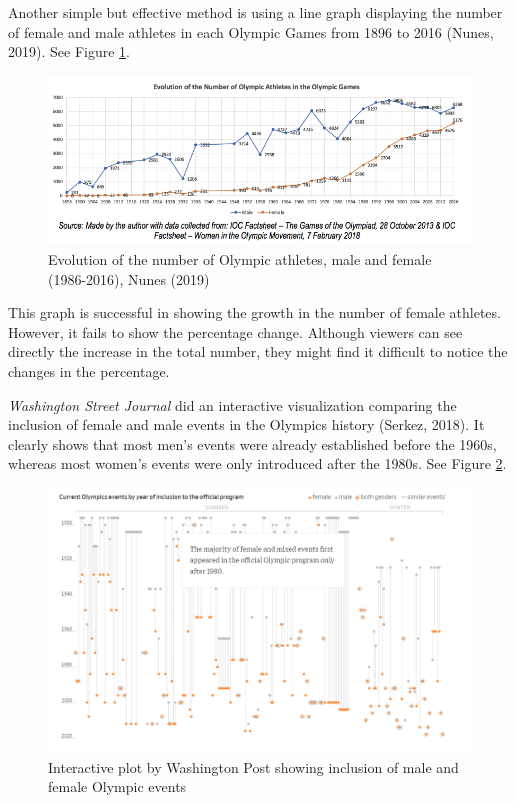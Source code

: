 \documentclass[
]{article}
\begin{document}
Another simple but effective method is using a line graph displaying the number of female and male athletes in each Olympic Games from 1896 to 2016 (Nunes, 2019). See Figure \ref{fig:figure01}.

\begin{figure}

{\centering \includegraphics[width=1\linewidth]{static/pics/1-3} 

}

\caption{Evolution of the number of Olympic athletes, male and female (1986-2016), Nunes (2019)}\label{fig:figure01}
\end{figure}

This graph is successful in showing the growth in the number of female athletes. However, it fails to show the percentage change. Although viewers can see directly the increase in the total number, they might find it difficult to notice the changes in the percentage.

\emph{Washington Street Journal} did an interactive visualization comparing the inclusion of female and male events in the Olympics history (Serkez, 2018). It clearly shows that most men's events were already established before the 1960s, whereas most women's events were only introduced after the 1980s. See Figure \ref{fig:figure02}.

\begin{figure}

{\centering \includegraphics[width=0.95\linewidth]{static/pics/1-4} 

}

\caption{Interactive plot by Washington Post showing inclusion of male and female Olympic events}\label{fig:figure02}
\end{figure}
\end{document}
